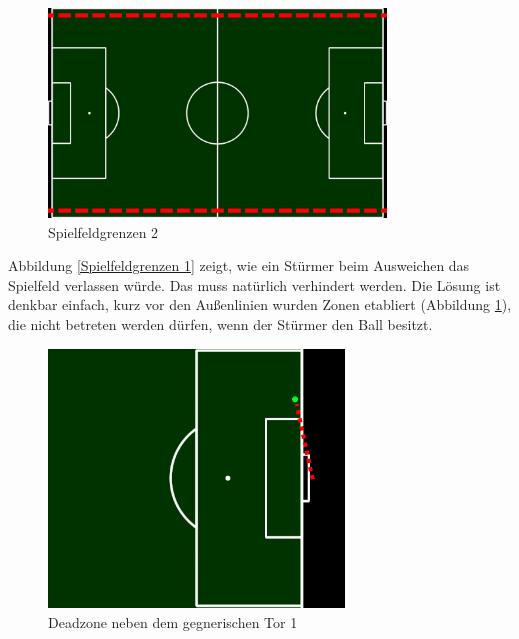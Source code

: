 \documentclass[fontsize=12pt,a4paper,final]{scrartcl}[2003/01/01]
\begin{document}
\begin{figure}[H]
	\centering
	\includegraphics[width=0.8\textwidth]{Grafiken/KI/deadzone_2}
	\caption{Spielfeldgrenzen 2}
	\label{Spielfeldgrenzen 2}
\end{figure}

Abbildung \ref{Spielfeldgrenzen 1} zeigt, wie ein Stürmer beim Ausweichen das Spielfeld verlassen würde. Das muss natürlich verhindert werden. Die Lösung ist denkbar einfach, kurz vor den Außenlinien wurden Zonen etabliert (Abbildung \ref{Spielfeldgrenzen 2}), die nicht betreten werden dürfen, wenn der Stürmer den Ball besitzt.

\begin{figure}[H]
	\centering
	\includegraphics[width=0.7\textwidth]{Grafiken/KI/deadzone_5}
	\caption{Deadzone neben dem gegnerischen Tor 1}
	\label{Deadzone neben dem gegnerischen Tor 1}
\end{figure}
\end{document}
